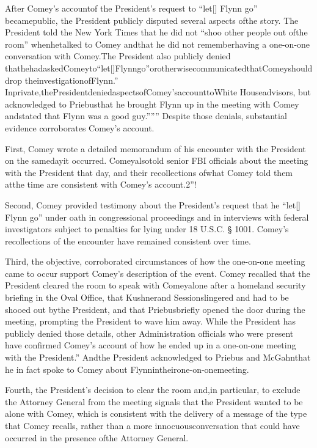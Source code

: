 After Comey’s accountof the President’s request to “let[] Flynn go” becamepublic, the President publicly disputed several aspects ofthe story. The President told the New York Times that he did not “shoo other people out ofthe room” whenhetalked to Comey andthat he did not rememberhaving a one-on-one conversation with Comey.The President also publicly denied thathehadaskedComeyto“let[]Flynngo”orotherwisecommunicatedthatComeyshoulddrop theinvestigationofFlynn.” Inprivate,thePresidentdeniedaspectsofComey’saccounttoWhite Houseadvisors, but acknowledged to Priebusthat he brought Flynn up in the meeting with Comey andstated that Flynn was a good guy.””” Despite those denials, substantial evidence corroborates Comey’s account.

First, Comey wrote a detailed memorandum of his encounter with the President on the samedayit occurred. Comeyalsotold senior FBI officials about the meeting with the President that day, and their recollections ofwhat Comey told them atthe time are consistent with Comey’s account.2”!

Second, Comey provided testimony about the President’s request that he “let[] Flynn go” under oath in congressional proceedings and in interviews with federal investigators subject to penalties for lying under 18 U.S.C. § 1001. Comey’s recollections of the encounter have remained consistent over time.

Third, the objective, corroborated circumstances of how the one-on-one meeting came to occur support Comey’s description of the event. Comey recalled that the President cleared the room to speak with Comeyalone after a homeland security briefing in the Oval Office, that Kushnerand Sessionslingered and had to be shooed out bythe President, and that Priebusbriefly opened the door during the meeting, prompting the President to wave him away. While the President has publicly denied those details, other Administration officials who were present have confirmed Comey’s account of how he ended up in a one-on-one meeting with the President.” Andthe President acknowledged to Priebus and McGahnthat he in fact spoke to Comey about Flynnintheirone-on-onemeeting.

Fourth, the President’s decision to clear the room and,in particular, to exclude the Attorney General from the meeting signals that the President wanted to be alone with Comey, which is consistent with the delivery of a message of the type that Comey recalls, rather than a more innocuousconversation that could have occurred in the presence ofthe Attorney General.

